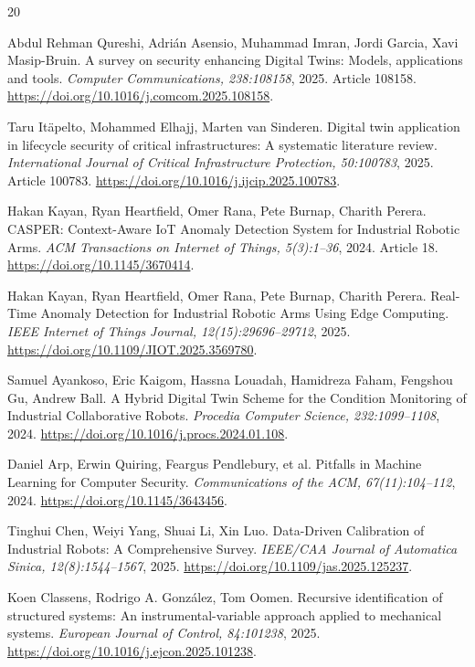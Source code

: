 \begin{thebibliography}{20}
\setlength{\itemsep}{1pt}\setlength{\parsep}{0pt}

 Abdul Rehman Qureshi, Adrián Asensio, Muhammad Imran, Jordi Garcia, Xavi Masip-Bruin. {A survey on security enhancing Digital Twins: Models, applications and tools}. \emph{Computer Communications, 238:108158}, 2025. Article 108158. \url{https://doi.org/10.1016/j.comcom.2025.108158}.

 Taru Itäpelto, Mohammed Elhajj, Marten van Sinderen. {Digital twin application in lifecycle security of critical infrastructures: A systematic literature review}. \emph{International Journal of Critical Infrastructure Protection, 50:100783}, 2025. Article 100783. \url{https://doi.org/10.1016/j.ijcip.2025.100783}.

 Hakan Kayan, Ryan Heartfield, Omer Rana, Pete Burnap, Charith Perera. {CASPER: Context-Aware IoT Anomaly Detection System for Industrial Robotic Arms}. \emph{ACM Transactions on Internet of Things, 5(3):1--36}, 2024. Article 18. \url{https://doi.org/10.1145/3670414}.

 Hakan Kayan, Ryan Heartfield, Omer Rana, Pete Burnap, Charith Perera. {Real-Time Anomaly Detection for Industrial Robotic Arms Using Edge Computing}. \emph{IEEE Internet of Things Journal, 12(15):29696--29712}, 2025. \url{https://doi.org/10.1109/JIOT.2025.3569780}.

 Samuel Ayankoso, Eric Kaigom, Hassna Louadah, Hamidreza Faham, Fengshou Gu, Andrew Ball. {A Hybrid Digital Twin Scheme for the Condition Monitoring of Industrial Collaborative Robots}. \emph{Procedia Computer Science, 232:1099--1108}, 2024. \url{https://doi.org/10.1016/j.procs.2024.01.108}.

 Daniel Arp, Erwin Quiring, Feargus Pendlebury, et al. {Pitfalls in Machine Learning for Computer Security}. \emph{Communications of the ACM, 67(11):104--112}, 2024. \url{https://doi.org/10.1145/3643456}.

 Tinghui Chen, Weiyi Yang, Shuai Li, Xin Luo. {Data-Driven Calibration of Industrial Robots: A Comprehensive Survey}. \emph{IEEE/CAA Journal of Automatica Sinica, 12(8):1544--1567}, 2025. \url{https://doi.org/10.1109/jas.2025.125237}.

 Koen Classens, Rodrigo A. Gonz{\'a}lez, Tom Oomen. {Recursive identification of structured systems: An instrumental-variable approach applied to mechanical systems}. \emph{European Journal of Control, 84:101238}, 2025. \url{https://doi.org/10.1016/j.ejcon.2025.101238}.


\end{thebibliography}
